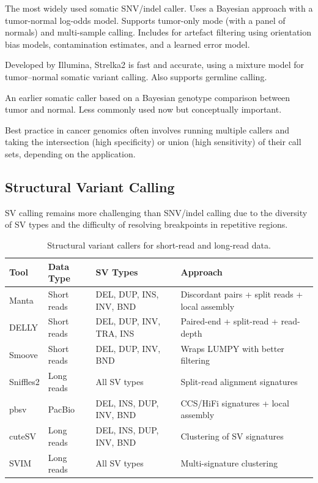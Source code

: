 \begin{description}[style=nextline]
  \item[Mutect2 (GATK)] The most widely used somatic SNV/indel caller. Uses a Bayesian approach with a tumor-normal log-odds model. Supports tumor-only mode (with a panel of normals) and multi-sample calling. Includes  for artefact filtering using orientation bias models, contamination estimates, and a learned error model.
  \item[Strelka2] Developed by Illumina, Strelka2 is fast and accurate, using a mixture model for tumor--normal somatic variant calling. Also supports germline calling.
  \item[SomaticSniper] An earlier somatic caller based on a Bayesian genotype comparison between tumor and normal. Less commonly used now but conceptually important.
  \item[Consensus approach] Best practice in cancer genomics often involves running multiple callers and taking the intersection (high specificity) or union (high sensitivity) of their call sets, depending on the application.
\end{description}

\subsection{Structural Variant Calling}

SV calling remains more challenging than SNV/indel calling due to the diversity of SV types and the difficulty of resolving breakpoints in repetitive regions.

\begin{table}[htbp]
\centering
\caption{Structural variant callers for short-read and long-read data.}
\label{tab:sv_callers}
\begin{tabularx}{\textwidth}{@{}llXl@{}}
\toprule
\textbf{Tool} & \textbf{Data Type} & \textbf{SV Types} & \textbf{Approach} \\
\midrule
Manta & Short reads & DEL, DUP, INS, INV, BND & Discordant pairs + split reads + local assembly \\
DELLY & Short reads & DEL, DUP, INV, TRA, INS & Paired-end + split-read + read-depth \\
Smoove & Short reads & DEL, DUP, INV, BND & Wraps LUMPY with better filtering \\
Sniffles2 & Long reads & All SV types & Split-read alignment signatures \\
pbsv & PacBio & DEL, INS, DUP, INV, BND & CCS/HiFi signatures + local assembly \\
cuteSV & Long reads & DEL, INS, DUP, INV, BND & Clustering of SV signatures \\
SVIM & Long reads & All SV types & Multi-signature clustering \\
\bottomrule
\end{tabularx}
\end{table}

